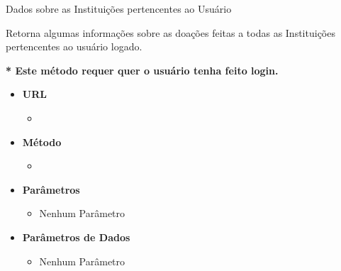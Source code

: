 
\begin{caixa}{Dados sobre as Instituições pertencentes ao Usuário}{}

Retorna algumas informações sobre as doações feitas a todas as Instituições pertencentes ao usuário logado.

\textbf{* Este método requer quer o usuário tenha feito login.}

\begin{itemize}
\item \textbf{URL}
	\begin{itemize}
		\item {}
	\end{itemize}

\item \textbf{Método}
	\begin{itemize}
		\item {}
	\end{itemize}

\item \textbf{Parâmetros}
	\begin{itemize}
        \item Nenhum Parâmetro
	\end{itemize}

\item \textbf{Parâmetros de Dados}
	\begin{itemize}
		\item Nenhum Parâmetro
	\end{itemize}


\end{itemize}
\end{caixa}
